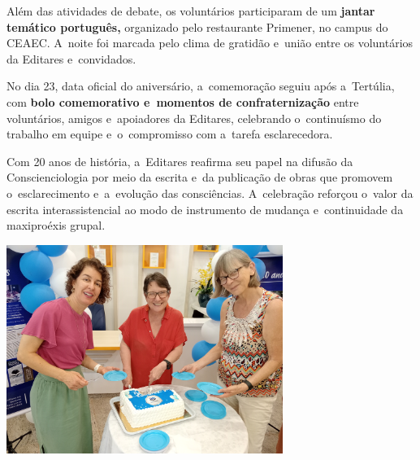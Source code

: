 \documentclass{gescons}
\begin{document}
\begin{multicols}{2}
Além das atividades de debate, os voluntários participaram de um \textbf{jantar temático português,} organizado pelo restaurante Primener, no campus do CEAEC. A~noite foi marcada pelo clima de gratidão e~união entre os voluntários da Editares e~convidados.

No dia 23, data oficial do aniversário, a~comemoração seguiu após a~Tertúlia, com \textbf{bolo comemorativo e~momentos de confraternização} entre voluntários, amigos e~apoiadores da Editares, celebrando o~continuísmo do trabalho em equipe e~o~compromisso com a~tarefa esclarecedora.

Com 20 anos de história, a~Editares reafirma seu papel na difusão da Conscienciologia por meio da escrita e~da publicação de obras que promovem o~esclarecimento e~a~evolução das consciências. A~celebração reforçou o~valor da escrita interassistencial ao modo de instrumento de mudança e~continuidade da maxiproéxis grupal.



\noindent\includegraphics[width=9cm]{articles/resumo/fotos/materia1/IMG20241023143149.jpg}
        
    \end{multicols}
\end{document}
